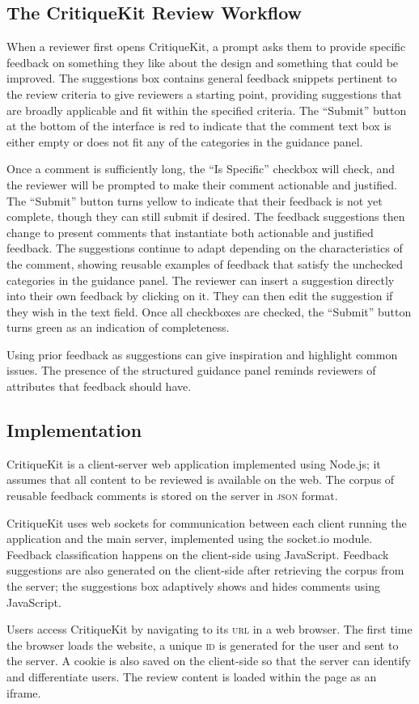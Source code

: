 \subsection{The CritiqueKit Review Workflow}
When a reviewer first opens CritiqueKit, a prompt asks them to provide specific feedback on something they like about the design and something that could be improved. The suggestions box contains general feedback snippets \cite{Kulkarni2013} pertinent to the review criteria to give reviewers a starting point, providing suggestions that are broadly applicable and fit within the specified criteria. The ``Submit'' button at the bottom of the interface is red to indicate that the comment text box is either empty or does not fit any of the categories in the guidance panel. 

Once a comment is sufficiently long, the ``Is Specific'' checkbox will check, and the reviewer will be prompted to make their comment actionable and justified. The ``Submit'' button turns yellow to indicate that their feedback is not yet complete, though they can still submit if desired. The feedback suggestions then change to present comments that instantiate both actionable and justified feedback. The suggestions continue to adapt depending on the characteristics of the comment, showing reusable examples of feedback that satisfy the unchecked categories in the guidance panel. The reviewer can insert a suggestion directly into their own feedback by clicking on it. They can then edit the suggestion if they wish in the text field. Once all checkboxes are checked, the ``Submit'' button turns green as an indication of completeness. 

Using prior feedback as suggestions can give inspiration and highlight common issues. The presence of the structured guidance panel reminds reviewers of attributes that feedback should have. 

\subsection{Implementation}
CritiqueKit is a client-server web application implemented using Node.js; it assumes that all content to be reviewed is available on the web. The corpus of reusable feedback comments is stored on the server in \textsc{json} format.

CritiqueKit uses web sockets for communication between each client running the application and the main server, implemented using the socket.io module. Feedback classification happens on the client-side using JavaScript. Feedback suggestions are also generated on the client-side after retrieving the corpus from the server; the suggestions box adaptively shows and hides comments using JavaScript. 

Users access CritiqueKit by navigating to its \textsc{url} in a web browser. The first time the browser loads the website, a unique \textsc{id} is generated for the user and sent to the server. A cookie is also saved on the client-side so that the server can identify and differentiate users. The review content is loaded within the page as an iframe.
